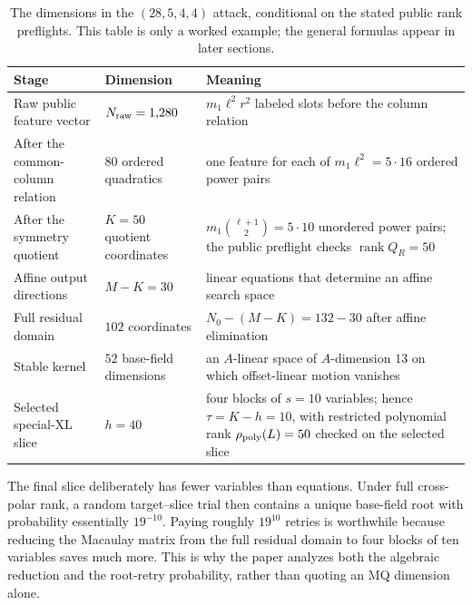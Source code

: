 \documentclass[11pt]{article}
\newcommand{\rank}{\operatorname{rank}}
\begin{document}
\begin{table}[H]
\centering
\caption{The dimensions in the $(28,5,4,4)$ attack, conditional on the stated
public rank preflights.  This table is only a worked example; the general
formulas appear in later sections.}
\label{tab:running-example}
\small
\renewcommand{\arraystretch}{1.12}
\begin{tabularx}{0.96\textwidth}{@{}>{\raggedright\arraybackslash}p{}>{\centering\arraybackslash}p{}X@{}}
\toprule
Stage & Dimension & Meaning\\
\midrule
Raw public feature vector & $N_{\rm raw}=1{,}280$ & $m_1\ell^2r^2$ labeled slots before
the column relation\\
After the common-column relation & $80$ ordered quadratics & one feature for
each of $m_1\ell^2=5\cdot16$ ordered power pairs\\
After the symmetry quotient & $K=50$ quotient coordinates &
$m_1\binom{\ell+1}{2}=5\cdot10$ unordered power pairs; the public preflight
checks $\rank Q_R=50$\\
Affine output directions & $M-K=30$ & linear equations that determine an
affine search space\\
Full residual domain & $102$ coordinates & $N_0-(M-K)=132-30$ after affine
elimination\\
Stable kernel & $52$ base-field dimensions & an $A$-linear space of
$A$-dimension $13$ on which offset-linear motion vanishes\\
Selected special-XL slice & $h=40$ & four blocks of $s=10$ variables; hence
$\tau=K-h=10$, with restricted polynomial rank
$\rho_{\rm poly}(L)=50$ checked on the selected slice\\
\bottomrule
\end{tabularx}
\end{table}

The final slice deliberately has fewer variables than equations.  Under full
cross-polar rank, a random target--slice trial then contains a unique
base-field root with probability essentially $19^{-10}$.  Paying roughly
$19^{10}$ retries is worthwhile because reducing the Macaulay matrix from the
full residual domain to four blocks of ten variables saves much more.  This is
why the paper analyzes both the algebraic reduction and the root-retry
probability, rather than quoting an MQ dimension alone.
\end{document}
